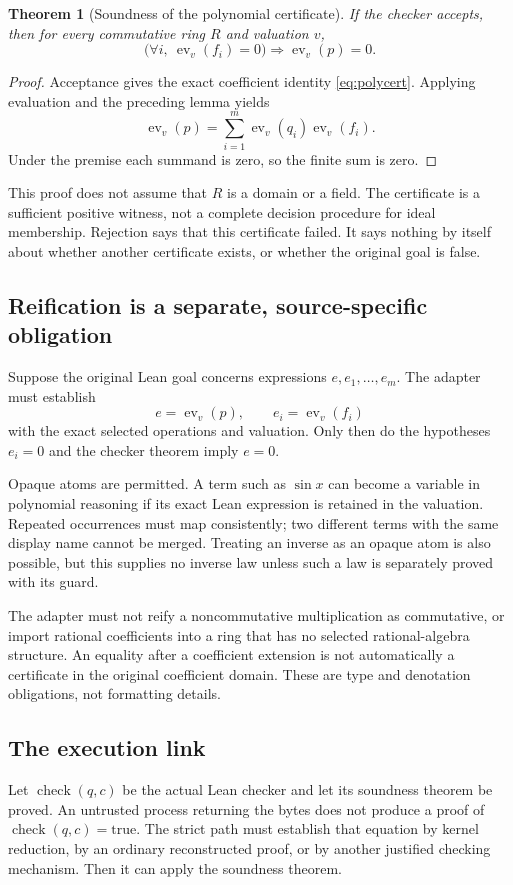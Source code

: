 \documentclass[11pt,a4paper]{article}
\newcommand{\code}[1]{\texttt{\detokenize{#1}}}
\newcommand{\ev}{\operatorname{ev}}
\theoremstyle{plain}
\newtheorem{theorem}{Theorem}[section]
\theoremstyle{definition}
\begin{document}
\begin{theorem}[Soundness of the polynomial certificate]
If the checker accepts, then for every commutative ring $R$ and valuation $v$,
\[
 \bigl(\forall i,\ \ev_v(f_i)=0\bigr)\Longrightarrow\ev_v(p)=0.
\]
\end{theorem}
\begin{proof}
Acceptance gives the exact coefficient identity \eqref{eq:polycert}. Applying evaluation and the preceding lemma yields
\[
 \ev_v(p)=\sum_{i=1}^m\ev_v(q_i)\ev_v(f_i).
\]
Under the premise each summand is zero, so the finite sum is zero.
\end{proof}
This proof does not assume that $R$ is a domain or a field. The certificate is a sufficient positive witness, not a complete decision procedure for ideal membership. Rejection says that this certificate failed. It says nothing by itself about whether another certificate exists, or whether the original goal is false.

\subsection{Reification is a separate, source-specific obligation}
Suppose the original Lean goal concerns expressions $e,e_1,\ldots,e_m$. The adapter must establish
\[
 e=\ev_v(p),\qquad e_i=\ev_v(f_i)
\]
with the exact selected operations and valuation. Only then do the hypotheses $e_i=0$ and the checker theorem imply $e=0$.

Opaque atoms are permitted. A term such as $\sin x$ can become a variable in polynomial reasoning if its exact Lean expression is retained in the valuation. Repeated occurrences must map consistently; two different terms with the same display name cannot be merged. Treating an inverse as an opaque atom is also possible, but this supplies no inverse law unless such a law is separately proved with its guard.

The adapter must not reify a noncommutative multiplication as commutative, or import rational coefficients into a ring that has no selected rational-algebra structure. An equality after a coefficient extension is not automatically a certificate in the original coefficient domain. These are type and denotation obligations, not formatting details.

\subsection{The execution link}
Let $\operatorname{check}(q,c)$ be the actual Lean checker and let its soundness theorem be proved. An untrusted process returning the bytes \code{true} does not produce a proof of $\operatorname{check}(q,c)=\mathrm{true}$. The strict path must establish that equation by kernel reduction, by an ordinary reconstructed proof, or by another justified checking mechanism. Then it can apply the soundness theorem.
\end{document}
